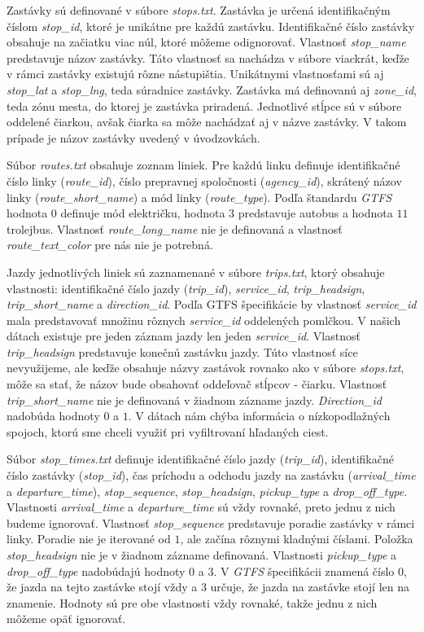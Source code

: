 Zastávky sú definované v súbore \textit{stops.txt}. Zastávka je určená identifikačným číslom \textit{stop\_id}, ktoré je unikátne pre každú zastávku. Identifikačné číslo zastávky obsahuje na začiatku viac núl, ktoré môžeme odignorovať. Vlastnosť \textit{stop\_name} predstavuje názov zastávky. Táto vlastnosť sa nachádza v súbore viackrát, keďže v rámci zastávky existujú rôzne nástupištia. Unikátnymi vlastnosťami sú aj \textit{stop\_lat} a \textit{stop\_lng}, teda súradnice zastávky. Zastávka má definovanú aj \textit{zone\_id}, teda zónu mesta, do ktorej je zastávka priradená. Jednotlivé stĺpce sú v súbore oddelené čiarkou, avšak čiarka sa môže nachádzať aj v názve zastávky. V takom prípade je názov zastávky uvedený v úvodzovkách.

Súbor \textit{routes.txt} obsahuje zoznam liniek. Pre každú linku definuje identifikačné číslo linky (\textit{route\_id}), číslo prepravnej spoločnosti (\textit{agency\_id}), skrátený názov linky (\textit{route\_short\_name}) a mód linky (\textit{route\_type}). Podľa štandardu \textit{GTFS} hodnota $0$ definuje mód električku, hodnota $3$ predstavuje autobus a hodnota $11$ trolejbus. Vlastnosť \textit{route\_long\_name} nie je definovaná a vlastnosť \textit{route\_text\_color} pre nás nie je potrebná.

Jazdy jednotlivých liniek sú zaznamenané v súbore \textit{trips.txt}, ktorý obsahuje vlastnosti: identifikačné číslo jazdy (\textit{trip\_id}), \textit{service\_id}, \textit{trip\_headsign}, \textit{trip\_short\_name} a \textit{direction\_id}. Podľa GTFS špecifikácie by vlastnosť \textit{service\_id} mala predstavovať množinu rôznych \textit{service\_id} oddelených pomlčkou. V našich dátach existuje pre jeden záznam jazdy len jeden \textit{service\_id}. Vlastnosť \textit{trip\_headsign} predstavuje konečnú zastávku jazdy. Túto vlastnosť síce nevyužijeme, ale keďže obsahuje názvy zastávok rovnako ako v súbore \textit{stops.txt}, môže sa stať, že názov bude obsahovať oddeľovač stĺpcov - čiarku. Vlastnosť \textit{trip\_short\_name} nie je definovaná v žiadnom zázname jazdy. \textit{Direction\_id} nadobúda hodnoty $0$ a $1$. V dátach nám chýba informácia o nízkopodlažných spojoch, ktorú sme chceli využiť pri vyfiltrovaní hľadaných ciest.

Súbor \textit{stop\_times.txt} definuje identifikačné číslo jazdy (\textit{trip\_id}), identifikačné číslo zastávky (\textit{stop\_id}), čas príchodu a odchodu jazdy na zastávku (\textit{arrival\_time} a \textit{departure\_time}), \textit{stop\_sequence}, \textit{stop\_headsign}, \textit{pickup\_type} a \textit{drop\_off\_type}. Vlastnosti \textit{arrival\_time} a \textit{departure\_time} sú vždy rovnaké, preto jednu z nich budeme ignorovať. Vlastnosť \textit{stop\_sequence} predstavuje poradie zastávky v rámci linky. Poradie nie je iterované od $1$, ale začína rôznymi kladnými číslami. Položka \textit{stop\_headsign} nie je v žiadnom zázname definovaná. Vlastnosti \textit{pickup\_type} a \textit{drop\_off\_type} nadobúdajú hodnoty $0$ a $3$. V \textit{GTFS} špecifikácii znamená číslo $0$, že jazda na tejto zastávke stojí vždy a $3$ určuje, že jazda na zastávke stojí len na znamenie. Hodnoty sú pre obe vlastnosti vždy rovnaké, takže jednu z nich môžeme opäť ignorovať.


